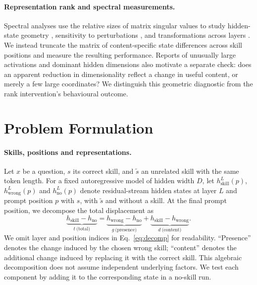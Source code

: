 \documentclass{article}
\newcommand{\dvec}{\ensuremath{d}}
\newcommand{\gvec}{\ensuremath{g}}
\newcommand{\tvec}{\ensuremath{t}}
\begin{document}
\paragraph{Representation rank and spectral measurements.}
Spectral analyses use the relative sizes of matrix singular values to study
hidden-state geometry \citep{valeriani2023geometry}, sensitivity to
perturbations \citep{sarkar2026causaldim}, and transformations across layers
\citep{fernando2026residualspectral}. We instead truncate the matrix of
content-specific state differences across skill positions and measure the
resulting performance. Reports of unusually large activations
\citep{sun2024massive, shi2026melayer} and dominant hidden dimensions
\citep{timkey2021rogue, kovaleva2021bertbusters} also motivate a separate check:
does an apparent reduction in dimensionality reflect a change in useful
content, or merely a few large coordinates? We distinguish this geometric
diagnostic from the rank intervention's behavioural outcome.

\section{Problem Formulation}
\label{sec:formulation}

\paragraph{Skills, positions and representations.}
Let $x$ be a question, $s$ its correct skill, and $\tilde{s}$ an unrelated skill
with the same token length. For a fixed autoregressive model of hidden width
$D$, let $h^L_{\mathrm{skill}}(p)$, $h^L_{\mathrm{wrong}}(p)$ and
$h^L_{\mathrm{no}}(p)$ denote residual-stream hidden states at layer $L$ and prompt position
$p$ with $s$, with $\tilde{s}$ and without a skill. At the final prompt position,
we decompose the total displacement as
\begin{equation}
\underbrace{h_{\mathrm{skill}}-h_{\mathrm{no}}}_{\tvec\ \text{(total)}}
=
\underbrace{h_{\mathrm{wrong}}-h_{\mathrm{no}}}_{\gvec\ \text{(presence)}}
+
\underbrace{h_{\mathrm{skill}}-h_{\mathrm{wrong}}}_{\dvec\ \text{(content)}}.
\label{eq:decomp}
\end{equation}
We omit layer and position indices in Eq.~\ref{eq:decomp} for readability.
``Presence'' denotes the change induced by the chosen wrong skill; ``content''
denotes the additional change induced by replacing it with the correct skill.
This algebraic decomposition does not assume independent underlying factors.
We test each component by adding it to the corresponding state in a no-skill run.
\end{document}
